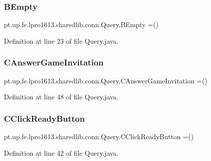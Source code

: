 \subsubsection{\texorpdfstring{B\+Empty}{BEmpty}}
{\footnotesize\ttfamily pt.\+up.\+fe.\+lpro1613.\+sharedlib.\+conn.\+Query.\+B\+Empty =()}



Definition at line 23 of file Query.\+java.

\hypertarget{enumpt_1_1up_1_1fe_1_1lpro1613_1_1sharedlib_1_1conn_1_1_query_a05335746d2327f5ad8b977eb6d491635}{}\label{enumpt_1_1up_1_1fe_1_1lpro1613_1_1sharedlib_1_1conn_1_1_query_a05335746d2327f5ad8b977eb6d491635} 
\subsubsection{\texorpdfstring{C\+Answer\+Game\+Invitation}{CAnswerGameInvitation}}
{\footnotesize\ttfamily pt.\+up.\+fe.\+lpro1613.\+sharedlib.\+conn.\+Query.\+C\+Answer\+Game\+Invitation =()}



Definition at line 48 of file Query.\+java.

\hypertarget{enumpt_1_1up_1_1fe_1_1lpro1613_1_1sharedlib_1_1conn_1_1_query_adf41fb6a24eb0a73a98ffdf2b6875e6a}{}\label{enumpt_1_1up_1_1fe_1_1lpro1613_1_1sharedlib_1_1conn_1_1_query_adf41fb6a24eb0a73a98ffdf2b6875e6a} 
\subsubsection{\texorpdfstring{C\+Click\+Ready\+Button}{CClickReadyButton}}
{\footnotesize\ttfamily pt.\+up.\+fe.\+lpro1613.\+sharedlib.\+conn.\+Query.\+C\+Click\+Ready\+Button =()}



Definition at line 42 of file Query.\+java.

